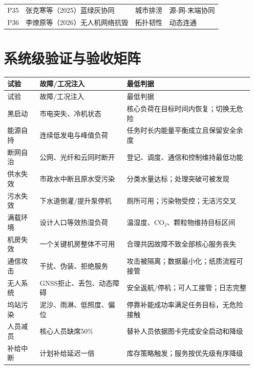 \documentclass[UTF8,a4paper,zihao=-4]{ctexart}
\begin{document}
\begin{longtable}{p{12mm}p{63mm}p{31mm}p{45mm}}
P35 & 张克寒等（2025）蓝绿灰协同 & 城市排涝 & 源-网-末端协同\\

P36 & 李燎原等（2026）无人机网络抗毁 & 拓扑韧性 & 动态连通\\

\bottomrule\end{longtable}\section{系统级验证与验收矩阵}\begin{longtable}{p{26mm}p{50mm}p{75mm}}\toprule 试验 & 故障/工况注入 & 最低判据\\\midrule\endfirsthead\toprule 试验 & 故障/工况注入 & 最低判据\\\midrule\endhead

黑启动 & 市电突失、冷机状态 & 核心负荷在目标时间内恢复；切换无危险\\

能源自持 & 连续低发电与峰值负荷 & 任务时长内能量平衡成立且保留安全余度\\

断网自治 & 公网、光纤和云同时断开 & 登记、调度、通信和控制维持最低功能\\

供水失效 & 市政水中断且原水受污染 & 分类水量达标；处理突破可被发现\\

污水失效 & 下水道倒灌/提升泵停机 & 厕所可用；污染物受控；无洁污交叉\\

满载环境 & 设计人口等效热湿负荷 & 温湿度、CO₂、颗粒物维持目标区间\\

机房失效 & 一个关键机房整体不可用 & 合理共因故障不致全部核心服务丧失\\

通信攻击 & 干扰、伪装、拒绝服务 & 攻击被隔离；数据最小化；纸质流程可接管\\

无人系统 & GNSS拒止、丢包、动态障碍 & 安全返航/停机；可人工接管；日志完整\\

坞站污染 & 泥沙、雨淋、低照度、偏位 & 停靠补能成功率满足任务目标，无危险接触\\

人员减员 & 核心人员缺席50\% & 替补人员依据图卡完成安全启动和降级\\

补给中断 & 计划补给延迟一倍 & 库存策略触发；服务按优先级有序降级\\

\bottomrule\end{longtable}
\end{document}
